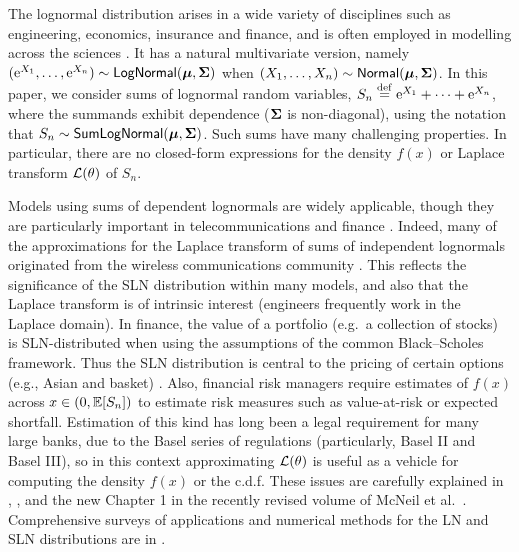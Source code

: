 The lognormal distribution arises in a wide variety of disciplines such as
engineering, economics, insurance and finance, and is often employed in
modelling across the sciences
\cite{aitchison1957lognormal,crow1988lognormal,dufresne2009sums,
  johnson1994continuous,limpert2001log}. It
has a natural multivariate version, namely $(\mathrm{e}^{X_1}, \dots, \mathrm{e}^{X_n})
\sim\mathsf{LogNormal}(\bm{\mu}, \bm{\Sigma})$ when $(X_1, \dots, X_n) \sim\mathsf{Normal}(\bm{\mu},
\bm{\Sigma})$. In this paper, we consider sums of lognormal random variables,
$S_n \overset{\mathrm{def}}{=} \mathrm{e}^{X_1} + \cdots + \mathrm{e}^{X_n}$, where the summands exhibit
dependence ($\bm{\Sigma}$ is non-diagonal), using the notation that $S_n
\sim\mathsf{SumLogNormal}(\bm{\mu}, \bm{\Sigma})$. Such sums have many challenging properties. In
particular, there are no closed-form expressions for the density $f(x)$ or
Laplace transform $\mathcal{L}(\theta)$ of $S_n$.

Models using sums of dependent lognormals are widely applicable, though they
are particularly important in telecommunications and finance
\cite{dufresne2004log,dufresne2009sums}. Indeed, many of the approximations
for the Laplace transform of sums of independent lognormals originated from
the wireless communications community \cite{beaulieu1995estimating}. This
reflects the significance of the SLN distribution within many models, and also
that the Laplace transform is of intrinsic interest (engineers frequently work
in the Laplace domain). In finance, the value of a portfolio (e.g.\ a
collection of stocks) is SLN-distributed when using the assumptions of the
common Black--Scholes framework. Thus the SLN distribution is central to the
pricing of certain options (e.g., Asian and basket)
\cite{milevsky1998asian}. Also, financial risk managers require estimates of
$f(x)$ across $x \in (0, \mathbb{E}[S_n])$ to estimate risk measures such as
value-at-risk or expected shortfall.  Estimation of this kind has long been a
legal requirement for many large banks, due to the Basel series of regulations
(particularly, Basel II and Basel III), so in this context approximating
$\mathcal{L}(\theta)$ is useful as a vehicle for computing the density $f(x)$ or
the c.d.f. These issues are carefully explained in
\cite{duellmann2010regulatory}, \cite{embrechts2014academic}, and the new
Chapter 1 in the recently revised volume of McNeil et
al.\ \cite{mcneil2015quantitative}. Comprehensive surveys of applications and
numerical methods for the LN and SLN distributions are in
\cite{tankov2015tail,asmussen2014laplace,asmussen2015exponential}.

